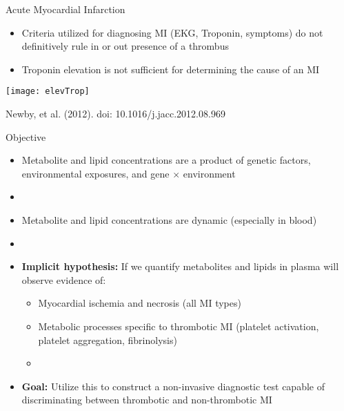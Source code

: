 \documentclass[xcolor=dvipsnames]{beamer}
\begin{document}
\begin{frame}{Acute Myocardial Infarction}
\vspace{-5pt}
\begin{itemize}
\item Criteria utilized for diagnosing MI (EKG, Troponin, symptoms) do not definitively rule in or out presence of a thrombus \pause
\item Troponin elevation is not sufficient for determining the cause of an MI \pause
\end{itemize}
\begin{center}
\texttt{[image: elevTrop]}

Newby, et al. (2012). doi: 10.1016/j.jacc.2012.08.969
\end{center}
\end{frame}

\begin{frame}{Objective}
\vspace{-10pt}
\begin{itemize}
\item Metabolite and lipid concentrations are a product of genetic factors, environmental exposures, and gene $\times$ environment \pause
\item[]
\item Metabolite and lipid concentrations are dynamic (especially in blood) \pause
\item[]
\item \textbf{Implicit hypothesis:} If we quantify metabolites and lipids in plasma will observe evidence of:
\begin{itemize}
\item Myocardial ischemia and necrosis (all MI types)
\item Metabolic processes specific to thrombotic MI (platelet activation, platelet aggregation, fibrinolysis) \pause
\item[]
\end{itemize}
\item \textbf{Goal:} Utilize this to construct a non-invasive diagnostic test capable of discriminating between thrombotic and non-thrombotic MI
\end{itemize}
\end{frame}
\end{document}

